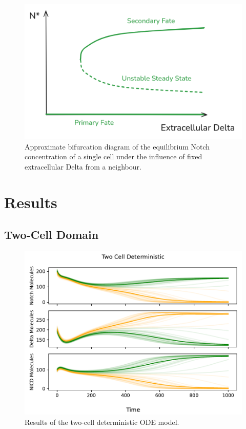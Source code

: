 \documentclass{article}
\begin{document}
\begin{flushleft}
\begin{figure}
  \includegraphics[width=\textwidth]{img/bifurcation-diagram.png}
  \caption{Approximate bifurcation diagram of the equilibrium Notch concentration of a single cell under the influence of fixed extracellular Delta from a neighbour.}
\end{figure}

\section{Results}

\subsection{Two-Cell Domain}

\begin{figure}
  \includegraphics[width=\textwidth]{img/two_cell_deterministic.pdf}
  \caption{Results of the two-cell deterministic ODE model.}
\end{figure}


\end{flushleft}
\end{document}
